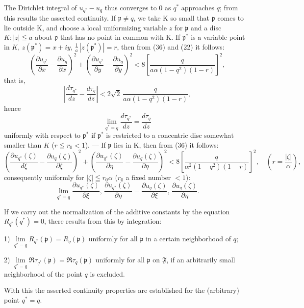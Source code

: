 \documentclass{article}
\begin{document}
The Dirichlet integral of $u_{q^*} - u_q$ thus converges to $0$ as $q^*$ approaches $q$; from this results the asserted continuity. If $\mathfrak{p} \neq q$, we take $\mathrm{K}$ so small that $\mathfrak{p}$ comes to lie outside $\mathrm{K}$, and choose a local uniformizing variable $z$ for $\mathfrak{p}$ and a disc $K\colon |z| \leqq a$ about $\mathfrak{p}$ that has no point in common with $\mathrm{K}$. If $\mathfrak{p}^*$ is a variable point in $K$, $z(\mathfrak{p}^*) = x + iy$, $\frac{1}{a}\,|z(\mathfrak{p}^*)| = r$, then from (36) and (22) it follows:
\[ \left( \frac{\partial u_{q^*}}{\partial x} - \frac{\partial u_q}{\partial x} \right)^2 + \left( \frac{\partial u_{q^*}}{\partial y} - \frac{\partial u_q}{\partial y} \right)^2 < 8 \left[ \frac{q}{a\alpha(1 - q^2)(1 - r)} \right]^2, \]
that is,
\[ \left| \frac{d\tau_{q^*}}{dz} - \frac{d\tau_q}{dz} \right| < 2\sqrt{2} \, \frac{q}{a\alpha(1 - q^2)(1 - r)}, \]
hence
\[ \lim_{q^* = q} \frac{d\tau_{q^*}}{dz} = \frac{d\tau_q}{dz} \tag{37} \]
uniformly with respect to $\mathfrak{p}^*$ if $\mathfrak{p}^*$ is restricted to a concentric disc somewhat smaller than $K$ ($r \leqq r_0 < 1$). --- If $\mathfrak{p}$ lies in $\mathrm{K}$, then from (36) it follows:
\[ \left( \frac{\partial u_{q^*}(\zeta)}{d\xi} - \frac{\partial u_q(\zeta)}{\partial\xi} \right)^2 + \left( \frac{\partial u_{q^*}(\zeta)}{\partial\eta} - \frac{\partial u_q(\zeta)}{\partial\eta} \right)^2 < 8 \left[ \frac{q}{\alpha^2(1 - q^2)(1 - r)} \right]^2, \quad \left( r = \frac{|\zeta|}{\alpha} \right), \]
consequently uniformly for $|\zeta| \leqq r_0\alpha$ ($r_0$ a fixed number $< 1$):
\[ \lim_{q^* = q} \frac{\partial u_{q^*}(\zeta)}{\partial\xi}, \, \frac{\partial u_{q^*}(\zeta)}{\partial\eta} = \frac{\partial u_q(\zeta)}{\partial\xi}, \, \frac{\partial u_q(\zeta)}{\partial\eta}. \]

If we carry out the normalization of the additive constants by the equation $R_{q^*}(q^*) = 0$, there results from this by integration:

1) $\lim\limits_{q^* = q} R_{q^*}(\mathfrak{p}) = R_q(\mathfrak{p})$ uniformly for all $\mathfrak{p}$ in a certain neighborhood of $q$;

2) $\lim\limits_{q^* = q} \Re\tau_{q^*}(\mathfrak{p}) = \Re\tau_q(\mathfrak{p})$ uniformly for all $\mathfrak{p}$ on $\mathfrak{F}$, if an arbitrarily small neighborhood of the point $q$ is excluded.

With this the asserted continuity properties are established for the (arbitrary) point $q^* = q$.
\end{document}
